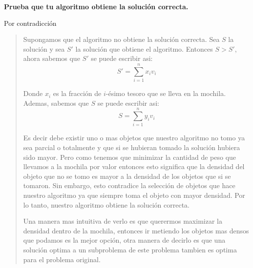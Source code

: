 \textbf{Prueba que tu algoritmo obtiene la solución correcta.}\vspace{.2cm}

\textcolor{bibi}{Por contradicción}
\begin{quote}
    Supongamos que el algoritmo no obtiene la solución correcta. Sea $S$ la solución y sea $S'$ la solución que obtiene el algoritmo. Entonces $S > S'$, ahora sabemos que $S'$ se puede escribir asi:
    \begin{equation*}
        S' = \sum_{i=1}^{n} x_i v_i
    \end{equation*}

    Donde $x_i$ es la fracción de $i$-ésimo tesoro que se lleva en la mochila. Ademas, sabemos que $S$ se puede escribir asi:
    \begin{equation*}
        S = \sum_{i=1}^{n} y_i v_i
    \end{equation*}

    Es decir debe existir uno o mas objetos que nuestro algoritmo no tomo ya sea parcial o totalmente y que si se hubieran tomado la solución hubiera sido mayor. Pero como tenemos que minimizar la cantidad de peso que llevamos a la mochila por valor entonces esto significa que la densidad del objeto que no se tomo es mayor a la densidad de los objetos que si se tomaron. Sin embargo, esto contradice la selección de objetos que hace nuestro algoritmo ya que siempre toma el objeto con mayor densidad. Por lo tanto, nuestro algoritmo obtiene la solución correcta. \vspace{.2cm}

    Una manera mas intuitiva de verlo es que querermos maximizar la densidad dentro de la mochila, entonces ir metiendo los objetos mas densos que podamos es la mejor opción, otra manera de decirlo es que una solución optima a un subproblema de este problema tambien es optima para el problema original. \vspace{.2cm}
\end{quote}